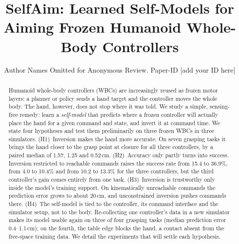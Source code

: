 \documentclass[conference]{IEEEtran}
\begin{document}
\title{SelfAim: Learned Self-Models for Aiming Frozen Humanoid Whole-Body Controllers}

\author{Author Names Omitted for Anonymous Review. Paper-ID [add your ID here]}

\maketitle

\begin{abstract}
Humanoid whole-body controllers (WBCs) are increasingly reused as frozen motor layers: a planner or policy sends a hand target and the controller moves the whole body. The hand, however, does not stop where it was told. We study a simple, sensing-free remedy: learn a \emph{self-model} that predicts where a frozen controller will actually place the hand for a given command and state, and invert it at command time. We state four hypotheses and test them preliminarily on three frozen WBCs in three simulators.
(H1)~Inversion makes the hand more accurate. On seven grasping tasks it brings the hand closer to the grasp point at closure for all three controllers, by a paired median of 1.57, 1.25 and 0.52\,cm.
(H2)~Accuracy only partly turns into success. Inversion restricted to reachable commands raises the success rate from 15.4 to 36.9\%, from 4.0 to 10.4\% and from 10.2 to 13.3\% for the three controllers, but the third controller's gain comes entirely from one task.
(H3)~Inversion is trustworthy only inside the model's training support. On kinematically unreachable commands the prediction error grows to about 20\,cm, and unconstrained inversion pushes commands there.
(H4)~The self-model is tied to the controller, its command interface and the simulator setup, not to the body. Re-collecting one controller's data in a new simulator makes its model usable again on three of four grasping tasks (median prediction error 0.4--1.1\,cm); on the fourth, the table edge blocks the hand, a contact absent from the free-space training data.
We detail the experiments that will settle each hypothesis.
\end{abstract}
\end{document}
